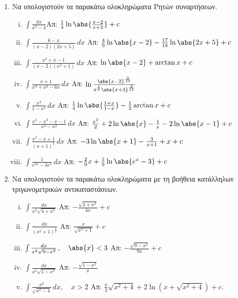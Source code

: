 


\pagestyle{askhseis}
\everymath{\displaystyle}




\begin{center}
  \minibox{\bfseries\large \textcolor{Col1}{Ολοκληρώματα Ρητών και Άρρητων Συναρτήσεων}}
\end{center}

\vspace{\baselineskip}

\begin{enumerate}

  \item Να υπολογιστούν τα παρακάτω ολοκληρώματα Ρητών συναρτήσεων.
    \begin{enumerate}[i)]
      \item $\int\frac{dx}{x^2-4}$\hfill Απ: $\frac{1}{4}\ln\abs{\frac{x-2}{x+2}}+c$
      \item $\int\frac{6-x}{(x-2)(2x+5)}\,dx$ 
        \hfill Απ: $ \frac{4}{9} \ln\abs{x-2}- \frac{17}{18} \ln{\abs{2x+5}} +c $
      \item $\int\frac{x^2+x-1}{(x-2)(x^2+1)}\,dx$ \hfill Απ: $\ln\abs{x-2}+\arctan x+c$
      \item $\int\frac{x+1}{x^3+x^2-6x}\,dx$ 
        \hfill Απ: $\ln\frac{\abs{x-2}^{\frac{3}{10}}}{x^{\frac{1}{6}}
        \abs{x+3}^{\frac{2}{15}}}$
      \item $\int\frac{x^2}{1-x^4}\,dx$ 
        \hfill Απ: $\frac{1}{4}\ln\abs{\frac{1+x}{1-x}}-\frac{1}{2}\arctan x+c$
      \item $\int\frac{x^4-x^3-x-1}{x^3-x^2}\,dx$ 
        \hfill Απ: $\frac{x^2}{2}+2\ln\abs{x}-\frac{1}{x}-2\ln\abs{x-1}+c$
      \item $\int \frac{x^2-x+1}{(x+1)^2}\,dx$
        \hfill Απ: $-3\ln\abs{x+1}-\frac{3}{x+1}+x+c$
      \item $\int\frac{1}{e^{2x}-3e^{x}}\,dx$ 
        \hfill Απ: $-\frac{2}{9}x+\frac{1}{9}\ln\abs{e^x-3}+c$
    \end{enumerate}

  \item Να υπολογιστούν τα παρακάτω ολοκληρώματα με τη βοήθεια κατάλληλων 
    τριγωνομετρικών αντικαταστάσεων.
    \begin{enumerate}[i)]
      \item $\int\frac{dx}{x^2\sqrt{4+x^2}}$ \hfill Απ: $-\frac{\sqrt{4+x^2}}{4x}+c$
      \item $\int\frac{dx}{(x^2+1)^{\frac{3}{2}}}$ \hfill Απ: $\frac{x}{\sqrt{x^2+1}}+c$
      \item $\int\frac{dx}{x^2\sqrt{9-x^2}}\,,\quad \abs{x}<3$ 
        \hfill Απ: $-\frac{\sqrt{9-x^2}}{9x}+c$
      \item $\int \frac{dx}{x^{2}\sqrt{1-x^{2}}}$ \hfill Απ: $-\frac{\sqrt{1-x^{2}}}{x}$
      \item $\int\frac{x^2}{\sqrt{x^2-4}}\,dx,\quad x>2$ 
        \hfill Απ: $\frac{x}{2}\sqrt{x^2+4}+2\ln(x+\sqrt{x^2+4})+c$.
    \end{enumerate}
\end{enumerate}





